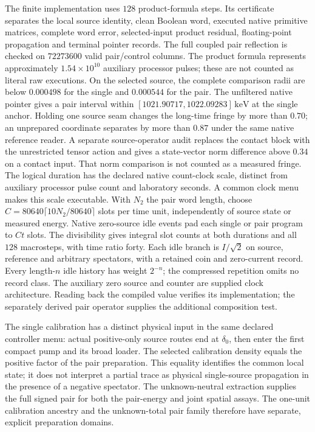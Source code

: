 The finite implementation uses $128$ product-formula steps. Its certificate
separates the local source identity, clean Boolean word, executed native
primitive matrices, complete word error, selected-input product residual,
floating-point propagation and terminal pointer records. The full coupled
pair reflection is checked on $72273600$ valid pair/control columns.
The product formula represents approximately $1.54\times10^{10}$ auxiliary
processor pulses; these are not counted as literal raw executions.
On the selected source, the complete comparison radii are below
$0.000498$ for the single and $0.000544$ for the pair. The unfiltered
native pointer gives a pair interval within
$[1021.90717,1022.09283]\,\mathrm{keV}$ at the single anchor.
Holding one source seam changes the long-time fringe by more than $0.70$;
an unprepared coordinate separates by more than $0.87$ under the same
native reference reader. A separate source-operator audit replaces the
contact block with the unrestricted tensor action and gives a state-vector
norm difference above $0.34$ on a contact input. That norm comparison
is not counted as a measured fringe. The logical duration has the declared native
count-clock scale, distinct from auxiliary processor pulse count and
laboratory seconds. A common clock menu makes this scale executable.
With $N_2$ the pair word length, choose
$C=80640\lceil10N_2/80640\rceil$ slots per time unit, independently of
source state or measured energy. Native zero-source idle events pad each
single or pair program to $Ct$ slots. The divisibility gives integral
slot counts at both durations and all $128$ macrosteps, with time ratio
forty. Each idle branch is $I/\sqrt2$ on source, reference and arbitrary
spectators, with a retained coin and zero-current record. Every length-$n$
idle history has weight $2^{-n}$; the compressed repetition omits no
record class. The auxiliary zero source and counter are supplied clock
architecture. Reading back the compiled value verifies its
implementation; the separately derived pair operator supplies the
additional composition test.

The single calibration has a distinct physical input in the same declared
controller menu: actual positive-only source routes end at $\delta_0$,
then enter the first compact pump and its broad loader. The selected
calibration density equals the positive factor of the pair preparation.
This equality identifies the common local state; it does not interpret
a partial trace as physical single-source propagation in the presence
of a negative spectator. The unknown-neutral extraction supplies the
full signed pair for both the pair-energy and joint spatial assays.
The one-unit calibration ancestry and the unknown-total pair family
therefore have separate, explicit preparation domains.

